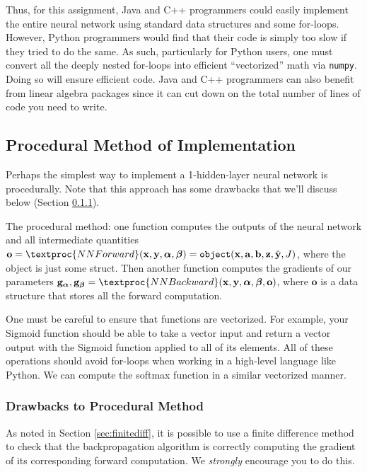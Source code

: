 \documentclass[11pt,addpoints,answers]{exam}
\newcommand{\av}{\mathbf{a}}
\newcommand{\bv}{\mathbf{b}}
\newcommand{\gv}{\mathbf{g}}
\newcommand{\ov}{\mathbf{o}}
\newcommand{\xv}{\mathbf{x}}
\newcommand{\yv}{\mathbf{y}}
\newcommand{\zv}{\mathbf{z}}
\newcommand{\alphav     }{\boldsymbol \alpha     }
\newcommand{\betav      }{\boldsymbol \beta      }
\begin{document}
Thus, for this assignment, Java and C++ programmers could easily implement the entire neural network using standard data structures and some for-loops. However, Python programmers would find that their code is simply too slow if they tried to do the same. As such, particularly for Python users, one must convert all the deeply nested for-loops into efficient ``vectorized'' math via \lstinline{numpy}. Doing so will ensure efficient code. Java and C++ programmers can also benefit from linear algebra packages since it can cut down on the total number of lines of code you need to write.

\subsection{Procedural Method of Implementation}
\label{sec:procedural}

Perhaps the simplest way to implement a 1-hidden-layer neural network is procedurally. Note that this approach has some drawbacks that we'll discuss below (Section \ref{sec:proceduraldrawbacks}). 

The procedural method: one function computes the outputs of the neural network and all intermediate quantities $\ov = \textproc{NNForward}(\xv, \yv, \alphav, \betav) = \texttt{object}( \xv, \av, \bv, \zv, \hat{\yv}, J)$, where the object is just some struct. Then another function computes the gradients of our parameters $\gv_{\alphav}, \gv_{\betav} = \textproc{NNBackward}(\xv, \yv, \alphav, \betav, \ov)$, where $\ov$ is a data structure that stores all the forward computation.

One must be careful to ensure that functions are vectorized. For example, your Sigmoid function should be able to take a vector input and return a vector output with the Sigmoid function applied to all of its elements. All of these operations should avoid for-loops when working in a high-level language like Python. We can compute the softmax function in a similar vectorized manner.

\subsubsection{Drawbacks to Procedural Method}
\label{sec:proceduraldrawbacks}

As noted in Section \ref{sec:finitediff}, it is possible to use a finite difference method to check that the backpropagation algorithm is correctly computing the gradient of its corresponding forward computation. We \emph{strongly} encourage you to do this.
\end{document}

